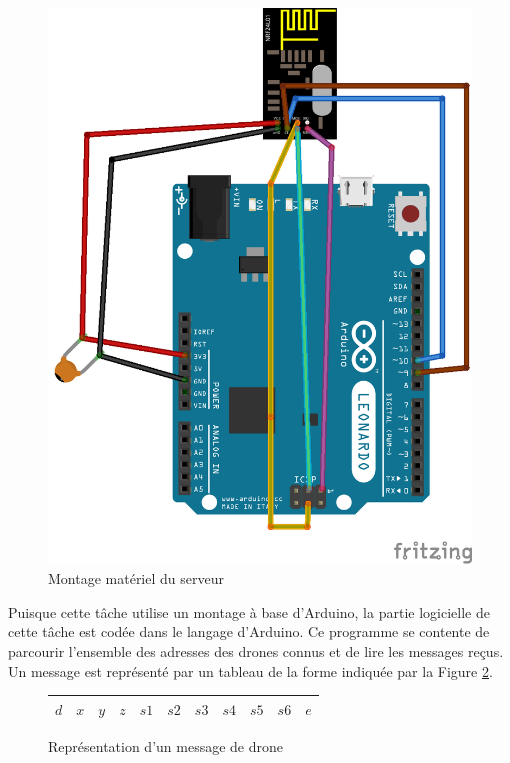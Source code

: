 \documentclass[a4paper,10pt]{report}
\begin{document}
	\begin{figure}[htbp]
	  \centering
	  \includegraphics[scale=0.8]{img/montage_serveur.png}
	  \caption{Montage matériel du serveur}
	  \label{montage_serveur}
	\end{figure}
	
      Puisque cette tâche utilise un montage à base d'Arduino, la partie 
logicielle de cette tâche est codée dans le langage d'Arduino. Ce programme se 
contente de parcourir l'ensemble des adresses des drones connus et de lire les 
messages reçus. Un message est représenté par un tableau de la forme indiquée 
par la Figure \ref{message_drone}.

	\begin{figure}
	  \begin{center}
	    \begin{tabular}{|c|c|c|c|c|c|c|c|c|c|c|}
	      \hline
	      $d$ & $x$ & $y$ & $z$ & $s1$ & $s2$ & $s3$ & $s4$ & $s5$ & $s6$ & 
$e$ \\
	      \hline
	    \end{tabular}
	  \end{center}
	  \label{message_drone}
	  \caption{Représentation d'un message de drone}
	\end{figure}
	
\end{document}
